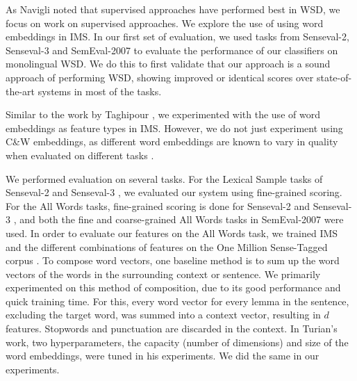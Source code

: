 \documentclass[11pt]{article}
\begin{document}
As Navigli  noted that supervised approaches have performed best in WSD, we focus on work on supervised approaches. 
We explore the use of using word embeddings in IMS. 
In our first set of evaluation, we used tasks from Senseval-2, Senseval-3 and SemEval-2007 to evaluate the performance of our classifiers on monolingual WSD. We do this to first validate that our approach is a sound approach of performing WSD, showing improved or identical scores over state-of-the-art systems in most of the tasks. 

Similar to the work by Taghipour , we experimented with the use of word embeddings as feature types in IMS. However, we do not just experiment using C\&W embeddings, as different word embeddings are known to vary in quality when evaluated on different tasks \cite{schnabel2015evaluation}. 

We performed evaluation on several tasks. For the Lexical Sample tasks of Senseval-2 \cite{senseval2-LS-kilgarriff2001} and Senseval-3 \cite{senseval3-LS-mihalcea2004}, we evaluated our system using fine-grained scoring. For the All Words tasks, fine-grained scoring is done for Senseval-2 \cite{senseval2-AW-palmer2001} and Senseval-3 \cite{senseval3-AW-snyder2004}, and both the fine \cite{semeval2007-fine-pradhan2007} and coarse-grained \cite{semeval2007-coarse-navigli2007} All Words tasks in SemEval-2007 were used. In order to evaluate our features on the All Words task, we trained IMS and the different combinations of features on the One Million Sense-Tagged corpus \cite{taghipour2015one}.
To compose word vectors, one baseline method is to sum up the word vectors of the words in the surrounding context or sentence. We primarily experimented on this method of composition, due to its good performance and quick training time. For this, every word vector for every lemma in the sentence, excluding the target word, was summed into a context vector, resulting in $d$ features. Stopwords and punctuation are discarded in the context. In Turian's  work, two hyperparameters, the capacity (number of dimensions) and size of the word embeddings, were tuned in his experiments. We did the same in our experiments.
\end{document}
